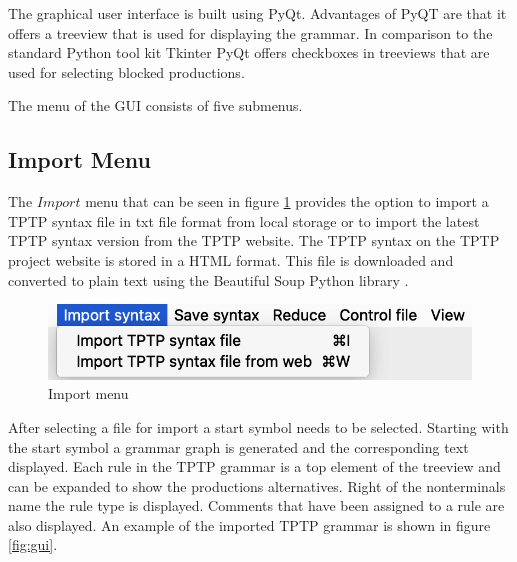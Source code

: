 The graphical user interface is built using PyQt. Advantages of PyQT are that it offers a treeview that is used for displaying the grammar. In comparison to the standard Python tool kit Tkinter PyQt offers checkboxes in treeviews \cite{Tkinter} that are used for selecting blocked productions.

The menu of the GUI consists of five submenus.

\subsection{Import Menu}\label{sec:ConceptGUIImportMenu}

The $Import$ menu that can be seen in figure \ref{fig:import} provides the option to import a \ac{TPTP} syntax file in txt file format from local storage or to import the latest \ac{TPTP} syntax version from the \ac{TPTP} website.
The \ac{TPTP} syntax on the \ac{TPTP} project website is stored in a HTML format.
This file is downloaded and converted to plain text using the Beautiful Soup Python library \cite{BeautifulSoup}.

\begin{figure}[H]
\centering
\includegraphics[width=.7\textwidth]{images/import.png}
\caption{Import menu}
\label{fig:import}
\end{figure}

After selecting a file for import a start symbol needs to be selected.
Starting with the start symbol a grammar graph is generated and the corresponding text displayed.
Each rule in the \ac{TPTP} grammar is a top element of the treeview and can be expanded to show the productions alternatives.
Right of the nonterminals name the rule type is displayed.
Comments that have been assigned to a rule are also displayed. An example of the imported \ac{TPTP} grammar is shown in figure \ref{fig:gui}.

